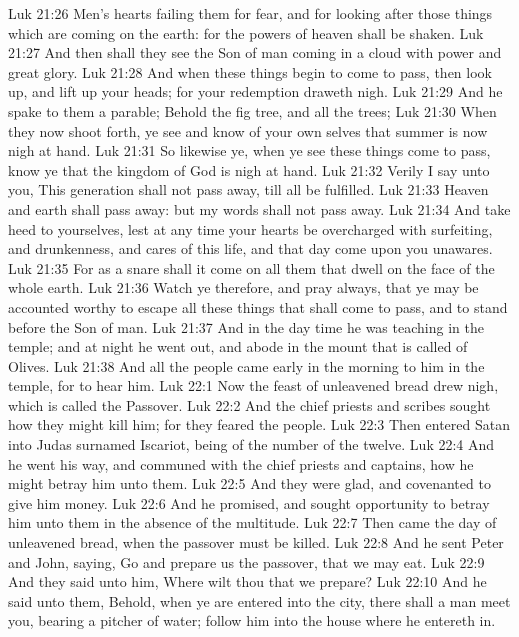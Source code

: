 \vs Luk 21:26 Men's hearts failing them for fear, and for looking after those things which are coming on the earth: for the powers of heaven shall be shaken.
\vs Luk 21:27 And then shall they see the Son of man coming in a cloud with power and great glory.
\vs Luk 21:28 And when these things begin to come to pass, then look up, and lift up your heads; for your redemption draweth nigh.
\vs Luk 21:29 And he spake to them a parable; Behold the fig tree, and all the trees;
\vs Luk 21:30 When they now shoot forth, ye see and know of your own selves that summer is now nigh at hand.
\vs Luk 21:31 So likewise ye, when ye see these things come to pass, know ye that the kingdom of God is nigh at hand.
\vs Luk 21:32 Verily I say unto you, This generation shall not pass away, till all be fulfilled.
\vs Luk 21:33 Heaven and earth shall pass away: but my words shall not pass away.
\vs Luk 21:34 And take heed to yourselves, lest at any time your hearts be overcharged with surfeiting, and drunkenness, and cares of this life, and  that day come upon you unawares.
\vs Luk 21:35 For as a snare shall it come on all them that dwell on the face of the whole earth.
\vs Luk 21:36 Watch ye therefore, and pray always, that ye may be accounted worthy to escape all these things that shall come to pass, and to stand before the Son of man.
\vs Luk 21:37 And in the day time he was teaching in the temple; and at night he went out, and abode in the mount that is called  of Olives.
\vs Luk 21:38 And all the people came early in the morning to him in the temple, for to hear him.
\vs Luk 22:1 Now the feast of unleavened bread drew nigh, which is called the Passover.
\vs Luk 22:2 And the chief priests and scribes sought how they might kill him; for they feared the people.
\vs Luk 22:3 Then entered Satan into Judas surnamed Iscariot, being of the number of the twelve.
\vs Luk 22:4 And he went his way, and communed with the chief priests and captains, how he might betray him unto them.
\vs Luk 22:5 And they were glad, and covenanted to give him money.
\vs Luk 22:6 And he promised, and sought opportunity to betray him unto them in the absence of the multitude.
\vs Luk 22:7 Then came the day of unleavened bread, when the passover must be killed.
\vs Luk 22:8 And he sent Peter and John, saying, Go and prepare us the passover, that we may eat.
\vs Luk 22:9 And they said unto him, Where wilt thou that we prepare?
\vs Luk 22:10 And he said unto them, Behold, when ye are entered into the city, there shall a man meet you, bearing a pitcher of water; follow him into the house where he entereth in.
